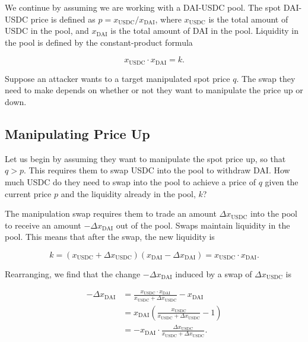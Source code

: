 \documentclass[a4paper, 11pt]{article}
\begin{document}
We continue by assuming we are working with a DAI-USDC pool. The spot DAI-USDC price is defined as $p = x_{\text{USDC}}/x_{\text{DAI}}$, where $x_{\text{USDC}}$ is the total amount of USDC in the pool, and $x_{\text{DAI}}$ is the total amount of DAI in the pool. Liquidity in the pool is defined by the constant-product formula

\begin{equation}
\label{eq:constant-product}
x_{\text{USDC}} \cdot x_{\text{DAI}} = k.
\end{equation}

Suppose an attacker wants to a target manipulated spot price $q$. The swap they need to make depends on whether or not they want to manipulate the price up or down. 

\subsection{Manipulating Price Up}

Let us begin by assuming they want to manipulate the spot price up, so that $q > p$. This requires them to swap USDC into the pool to withdraw DAI. How much USDC do they need to swap into the pool to achieve a price of $q$ given the current price $p$ and the liquidity already in the pool, $k$?

The manipulation swap requires them to trade an amount $\Delta x_{\text{USDC}}$ into the pool to receive an amount $-\Delta x_{\text{DAI}}$ out of the pool. Swaps maintain liquidity in the pool. This means that after the swap, the new liquidity is

\begin{equation}
k = (x_{\text{USDC}} + \Delta x_{\text{USDC}}) (x_{\text{DAI}} - \Delta x_{\text{DAI}}) = x_{\text{USDC}} \cdot x_{\text{DAI}}.
\end{equation}

Rearranging, we find that the change $-\Delta x_{\text{DAI}}$ induced by a swap of $\Delta x_{\text{USDC}}$ is 

\begin{align}
\label{eq:change-delta-x}
-\Delta x_{\text{DAI}} 
&= 
\frac{x_{\text{USDC}} \cdot x_{\text{DAI}}}{x_{\text{USDC}} + \Delta x_{\text{USDC}}} - x_{\text{DAI}} \\ \nonumber
&=
x_{\text{DAI}} \left( \frac{x_{\text{USDC}}}{x_{\text{USDC}} + \Delta x_{\text{USDC}}} - 1 \right) \\ \nonumber
&=
-x_{\text{DAI}} \cdot \frac{\Delta x_{\text{USDC}}}{x_{\text{USDC}} + \Delta x_{\text{USDC}}}.
\end{align}
\end{document}
